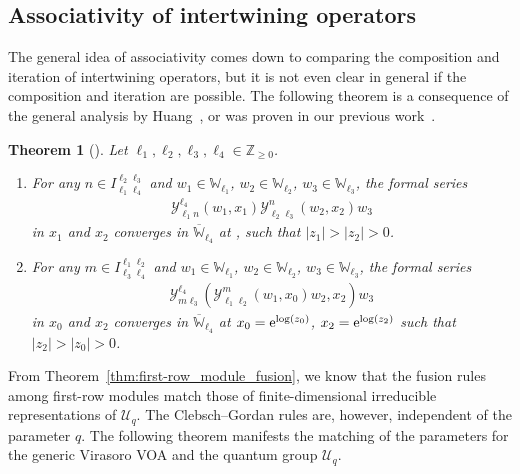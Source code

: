 \documentclass[pdftex]{sigma}
\numberwithin{equation}{section}
\newtheorem{thm}{Theorem}[section]
\newcommand{\ol}[1]{\overline{#1}}
\newcommand{\bZ}{\mathbb{Z}}
\newcommand{\cU}{\mathcal{U}}
\newcommand{\UEA}{\cU}
\newcommand{\Uq}{\UEA_{q}}
\newcommand{\Chan}[4]{I^{#1 #2}_{#3 #4}}
\newcommand{\voaint}{\mathcal{Y}}
\newcommand{\vmodvec}{w}
\newcommand{\virmod}{\mathbb{W}}
\begin{document}
\subsection{Associativity of intertwining operators}
The general idea of associativity comes down to comparing the composition and iteration of intertwining operators,
but it is not even clear in general if the composition and iteration are possible.
The following theorem is a consequence of the general analysis by Huang~\cite{Huang2005},
or was proven in our previous work~\cite{KoshidaKytola2022}.

\begin{thm}[\cite{Huang2005,KoshidaKytola2022}]
Let $\ell_{1},\ell_{2},\ell_{3},\ell_{4}\in\bZ_{\geq 0}$.
\begin{enumerate}\itemsep=0pt
 \item[$(1)$] For any $n\in \Chan{\ell_{2}}{\ell_{3}}{\ell_{1}}{\ell_{4}}$ and $\vmodvec_{1}\in \virmod_{\ell_{1}}$, $\vmodvec_{2}\in\virmod_{\ell_{2}}$, $\vmodvec_{3}\in\virmod_{\ell_{3}}$, the formal series
 \begin{gather*}
 \voaint_{\ell_{1} n}^{\ell_{4}}(\vmodvec_{1},x_{1})\voaint_{\ell_{2} \ell_{3}}^{n}(\vmodvec_{2},x_{2})\vmodvec_{3}
 \end{gather*}
 in $x_{1}$ and $x_{2}$ converges in $\ol{\virmod}_{\ell_{4}}$ at ,  such that $|z_{1}|>|z_{2}|>0$.
 \item[$(2$] For any $m\in \Chan{\ell_{1}}{\ell_{2}}{\ell_{3}}{\ell_{4}}$ and $\vmodvec_{1}\in \virmod_{\ell_{1}}$, $\vmodvec_{2}\in\virmod_{\ell_{2}}$, $\vmodvec_{3}\in\virmod_{\ell_{3}}$, the formal series
 \begin{gather*}
 \voaint_{m \ell_{3}}^{\ell_{4}}\left(\voaint_{\ell_{1} \ell_{2}}^{m}(\vmodvec_{1},x_{0})\vmodvec_{2},x_{2}\right)\vmodvec_{3}
 \end{gather*}
 in $x_{0}$ and $x_{2}$ converges in $\ol{\virmod}_{\ell_{4}}$ at $x_{0}={\rm e}^{\log (z_{0})}$, $x_{2}={\rm e}^{\log (z_{2})}$ such that $|z_{2}|>|z_{0}|>0$.
\end{enumerate}
\end{thm}

From Theorem~\ref{thm:first-row_module_fusion}, we know that the fusion rules among first-row modules match those of finite-dimensional irreducible representations of $\Uq$.
The Clebsch--Gordan rules are, however, independent of the parameter $q$.
The following theorem manifests the matching of the parameters for the generic Virasoro VOA and the quantum group $\Uq$.
\end{document}
